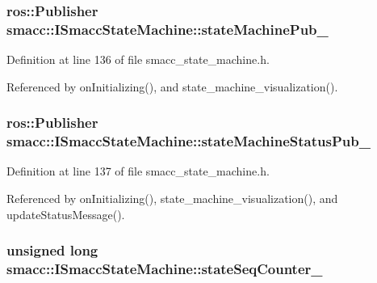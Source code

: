 \subsubsection[{\texorpdfstring{state\+Machine\+Pub\+\_\+}{stateMachinePub_}}]{\setlength{\rightskip}{0pt plus 5cm}ros\+::\+Publisher smacc\+::\+I\+Smacc\+State\+Machine\+::state\+Machine\+Pub\+\_\+\hspace{0.3cm}{\ttfamily [protected]}}\hypertarget{classsmacc_1_1ISmaccStateMachine_af4aa9fed70bd4c57b19e3370fbd25de7}{}\label{classsmacc_1_1ISmaccStateMachine_af4aa9fed70bd4c57b19e3370fbd25de7}


Definition at line 136 of file smacc\+\_\+state\+\_\+machine.\+h.



Referenced by on\+Initializing(), and state\+\_\+machine\+\_\+visualization().

\subsubsection[{\texorpdfstring{state\+Machine\+Status\+Pub\+\_\+}{stateMachineStatusPub_}}]{\setlength{\rightskip}{0pt plus 5cm}ros\+::\+Publisher smacc\+::\+I\+Smacc\+State\+Machine\+::state\+Machine\+Status\+Pub\+\_\+\hspace{0.3cm}{\ttfamily [protected]}}\hypertarget{classsmacc_1_1ISmaccStateMachine_a55a7c7b26ad4dfea441c62c6326a5414}{}\label{classsmacc_1_1ISmaccStateMachine_a55a7c7b26ad4dfea441c62c6326a5414}


Definition at line 137 of file smacc\+\_\+state\+\_\+machine.\+h.



Referenced by on\+Initializing(), state\+\_\+machine\+\_\+visualization(), and update\+Status\+Message().

\subsubsection[{\texorpdfstring{state\+Seq\+Counter\+\_\+}{stateSeqCounter_}}]{\setlength{\rightskip}{0pt plus 5cm}unsigned long smacc\+::\+I\+Smacc\+State\+Machine\+::state\+Seq\+Counter\+\_\+\hspace{0.3cm}{\ttfamily [private]}}\hypertarget{classsmacc_1_1ISmaccStateMachine_ab41ee07d20715142e2f7c92d551b2bd6}{}\label{classsmacc_1_1ISmaccStateMachine_ab41ee07d20715142e2f7c92d551b2bd6}


